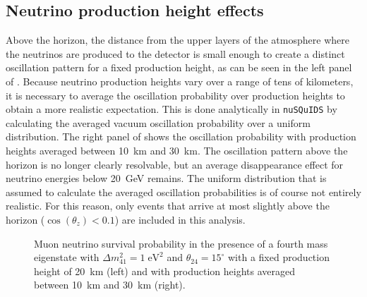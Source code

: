 \subsection{Neutrino production height effects}
Above the horizon, the distance from the upper layers of the atmosphere where the neutrinos are produced to the detector is small enough to create a distinct oscillation pattern for a fixed production height, as can be seen in the left panel of .
Because neutrino production heights vary over a range of tens of kilometers, it is necessary to average the oscillation probability over production heights to obtain a more realistic expectation.
This is done analytically in \texttt{nuSQuIDS}\cite{squids, nusquids} by calculating the averaged vacuum oscillation probability over a uniform distribution.
The right panel of  shows the oscillation probability with production heights averaged between 10~km and 30~km.
The oscillation pattern above the horizon is no longer clearly resolvable, but an average disappearance effect for neutrino energies below 20~GeV remains.
The uniform distribution that is assumed to calculate the averaged oscillation probabilities is of course not entirely realistic.
For this reason, only events that arrive at most slightly above the horizon ($\cos(\theta_z)<0.1$) are included in this analysis.

\begin{figure}
    \centering
    
    \caption{Muon neutrino survival probability in the presence of a fourth mass eigenstate with $\Delta m^2_{41}=1\;\mathrm{eV^2}$ and $\theta_{24}=15^\circ$ with a fixed production height of 20~km (left) and with production heights averaged between 10~km and 30~km (right).\label{fig:numu_survival_1eV2_full_range}}
\end{figure}

